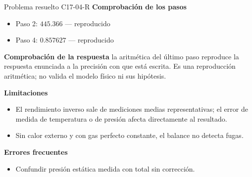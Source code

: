 \documentclass[10pt,openany]{book}
\begin{document}
\begin{studiumworked}{Problema resuelto C17-04-R}
\noindent\textbf{Comprobación de los pasos}
\begin{itemize}
\item Paso 2: $445.366$ — reproducido
\item Paso 4: $0.857627$ — reproducido
\end{itemize}

\noindent\textbf{Comprobación de la respuesta} la aritmética del último paso reproduce la respuesta enunciada a la precisión con que está escrita. Es una reproducción aritmética; no valida el modelo físico ni sus hipótesis.

\noindent\textbf{Limitaciones}
\begin{itemize}
\item El rendimiento inverso sale de mediciones medias representativas; el error de medida de temperatura o de presión afecta directamente al resultado.
\item Sin calor externo y con gas perfecto constante, el balance no detecta fugas.
\end{itemize}

\noindent\textbf{Errores frecuentes}
\begin{itemize}
\item Confundir presión estática medida con total sin corrección.
\end{itemize}
\end{studiumworked}
\end{document}
